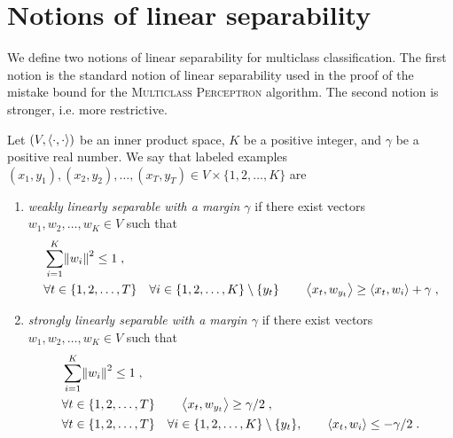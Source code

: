 \section{Notions of linear separability}
\label{section:notions-of-linear-separability}

We define two notions of linear separability for multiclass classification. The
first notion is the standard notion of linear separability used in the proof of
the mistake bound for the \textsc{Multiclass Perceptron} algorithm\citep[see e.g.][]{Crammer-Singer-2003}. The second
notion is stronger, i.e. more restrictive. %

\begin{definition}
\label{definition:linear-separability}
Let $(V,\left\langle \cdot, \cdot \right\rangle)$ be an inner product space, $K$ be a positive
integer, and $\gamma$ be a positive real number.
We say that labeled examples $(x_1, y_1),
(x_2, y_2), \dots, (x_T, y_T) \in V \times \{1,2,\dots,K\}$ are
\begin{enumerate}
\item
\emph{weakly linearly separable with a margin $\gamma$} if there exist vectors
$w_1, w_2, \dots, w_K \in V$ such that
\begin{align}
\label{equation:weak-linear-separability-1}
& \sum_{i=1}^K \norm{w_i}^2 \le 1 \; , \\
\label{equation:weak-linear-separability-2}
& \begin{gathered}
\forall t \in \{1,2,\dots,T\} \quad \forall i \in \{1,2,\dots, K\} \setminus \{y_t\} \qquad
\left\langle x_t, w_{y_t} \right\rangle \ge \left\langle x_t, w_i \right\rangle + \gamma \; ,
\end{gathered}
\end{align}
\item
\emph{strongly linearly separable with a margin $\gamma$} if there exist vectors
$w_1, w_2, \dots, w_K \in V$ such that
\begin{align}
\label{equation:strong-linear-separability-1}
& \sum_{i=1}^K \norm{w_i}^2 \le 1 \; , \\
\label{equation:strong-linear-separability-2}
& \forall t \in \{1,2,\dots,T\} \qquad \left\langle x_t, w_{y_t} \right\rangle \ge \gamma/2 \; , \\
\label{equation:strong-linear-separability-3}
& \begin{gathered}
\forall t \in \{1,2,\dots,T\} \quad \forall i \in \{1,2,\dots, K\} \setminus \{y_t\}, \qquad
\left\langle x_t, w_i \right\rangle \le - \gamma/2 \; .
\end{gathered}
\end{align}
\end{enumerate}
\end{definition}

